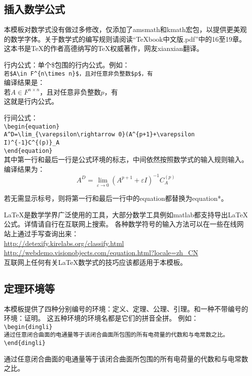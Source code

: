 \subsection{插入数学公式}
本模板对数学式没有做过多修改，仅添加了amsmath和kmath宏包，以提供更美观的数学字体。关于数学式的编写规则请阅读“TeXbook中文版.pdf”中的16至19章。这本书是\TeX{}的作者高德纳写的\TeX{}权威著作，网友xianxian翻译。

行内公式：单个\$包围的行内公式。例如：\\
\verb|若$A\in F^{n\times n}$，且对任意非负整数$p$，有|\\
编译结果是：\\
若$A\in F^{n\times n}$，且对任意非负整数$p$，有\\
这就是行内公式。

行间公式：\\
\verb|\begin{equation}|\\
\verb|A^D=\lim_{\varepsilon\rightarrow 0}(A^{p+1}+\varepsilon I)^{-1}C^{(p)}_A|\\
\verb|\end{equation}|\\
其中第一行和最后一行是公式环境的标志，中间依然按照数学式的输入规则输入。\\
编译结果为：\\
\begin{equation}
A^D=\lim_{\varepsilon\rightarrow 0}(A^{p+1}+\varepsilon I)^{-1}C^{(p)}_A
\end{equation}

若无需显示标号，则将第一行和最后一行中的equation都替换为equation*。

\LaTeX 是数学学界广泛使用的工具，大部分数学工具例如matlab都支持导出LaTeX公式。详情请自行在互联网上搜索。
各种数学符号的输入方法可以在一些在线网站上通过手写查询出来：\\\url{http://detexify.kirelabs.org/classify.html}\\
\url{http://webdemo.visionobjects.com/equation.html?locale=zh_CN}\\
互联网上任何有关LaTeX数学式的技巧应该都适用于本模板。

\subsection{定理环境等}
本模板提供了四种分别编号的环境：定义、定理、公理、引理。和一种不带编号的环境：证明。
这五种环境的环境名都是它们的拼音全拼。
例如：\\
\verb|\begin{dingli}|\\
\verb|通过任意闭合曲面的电通量等于该闭合曲面所包围的所有电荷量的代数和与电常数之比。|\\
\verb|\end{dingli}|\\
\begin{dingli}
通过任意闭合曲面的电通量等于该闭合曲面所包围的所有电荷量的代数和与电常数之比。
\end{dingli}

